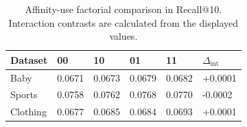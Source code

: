 \begin{table}[t]
\centering
\caption{Affinity-use factorial comparison in Recall@10. Interaction contrasts are calculated from the displayed values.}
\begin{tabular}{llllll}
\toprule
Dataset & 00 & 10 & 01 & 11 & $\Delta_{\mathrm{int}}$ \\
\midrule
Baby & 0.0671 & 0.0673 & 0.0679 & 0.0682 & +0.0001 \\
Sports & 0.0758 & 0.0762 & 0.0768 & 0.0770 & -0.0002 \\
Clothing & 0.0677 & 0.0685 & 0.0684 & 0.0693 & +0.0001 \\
\bottomrule
\end{tabular}
\end{table}
